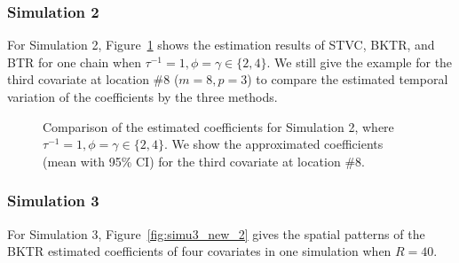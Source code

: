 \documentclass[12pt]{article}
\begin{document}



\subsubsection{Simulation 2}\label{appD1}

For Simulation 2, Figure~\ref{fig:simu2_temporal_2} shows the estimation results of STVC, BKTR, and BTR for one chain when $\tau^{-1}=1, \phi=\gamma\in\{2,4\}$. We still give the example for the third covariate at location \#8 ($m=8, p=3$) to compare the estimated temporal variation of the coefficients by the three methods.


\begin{figure}[!ht]
\centering
{}
\caption{Comparison of the estimated coefficients for Simulation 2, where $\tau^{-1}=1,\phi=\gamma\in\{2,4\}$. We show the approximated coefficients (mean with 95\% CI) for the third covariate at location \#8.}
\label{fig:simu2_temporal_2}
\end{figure}



\subsubsection{Simulation 3}\label{appD2}

For Simulation 3, Figure~\ref{fig:simu3_new_2} gives the spatial patterns of the BKTR estimated coefficients of four covariates in one simulation when $R=40$.
\end{document}
